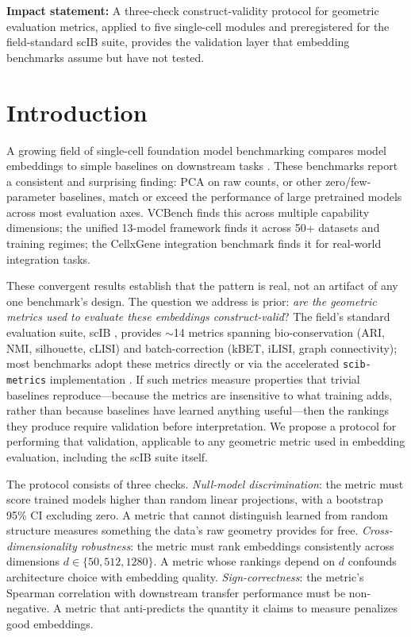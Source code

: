 \documentclass[9pt,lineno]{elife}
\begin{document}
\noindent\textbf{Impact statement:} A three-check construct-validity protocol for geometric evaluation metrics, applied to five single-cell modules and preregistered for the field-standard scIB suite, provides the validation layer that embedding benchmarks assume but have not tested.


\section{Introduction}

A growing field of single-cell foundation model benchmarking compares model embeddings to simple baselines on downstream tasks \citep{luecken2022scib, wu2025scfm, vcbench2026, unifiedscfm2026, cellxgeneintegration2026}. These benchmarks report a consistent and surprising finding: PCA on raw counts, or other zero/few-parameter baselines, match or exceed the performance of large pretrained models across most evaluation axes. VCBench \citep{vcbench2026} finds this across multiple capability dimensions; the unified 13-model framework \citep{unifiedscfm2026} finds it across 50+ datasets and training regimes; the CellxGene integration benchmark \citep{cellxgeneintegration2026} finds it for real-world integration tasks.

These convergent results establish that the pattern is real, not an artifact of any one benchmark's design. The question we address is prior: \emph{are the geometric metrics used to evaluate these embeddings construct-valid}? The field's standard evaluation suite, scIB \citep{luecken2022scib}, provides $\sim$14 metrics spanning bio-conservation (ARI, NMI, silhouette, cLISI) and batch-correction (kBET, iLISI, graph connectivity); most benchmarks adopt these metrics directly or via the accelerated \texttt{scib-metrics} implementation \citep{scibmetrics2023}. If such metrics measure properties that trivial baselines reproduce---because the metrics are insensitive to what training adds, rather than because baselines have learned anything useful---then the rankings they produce require validation before interpretation. We propose a protocol for performing that validation, applicable to any geometric metric used in embedding evaluation, including the scIB suite itself.

The protocol consists of three checks. \emph{Null-model discrimination}: the metric must score trained models higher than random linear projections, with a bootstrap 95\% CI excluding zero. A metric that cannot distinguish learned from random structure measures something the data's raw geometry provides for free. \emph{Cross-dimensionality robustness}: the metric must rank embeddings consistently across dimensions $d \in \{50, 512, 1280\}$. A metric whose rankings depend on $d$ confounds architecture choice with embedding quality. \emph{Sign-correctness}: the metric's Spearman correlation with downstream transfer performance must be non-negative. A metric that anti-predicts the quantity it claims to measure penalizes good embeddings.
\end{document}
